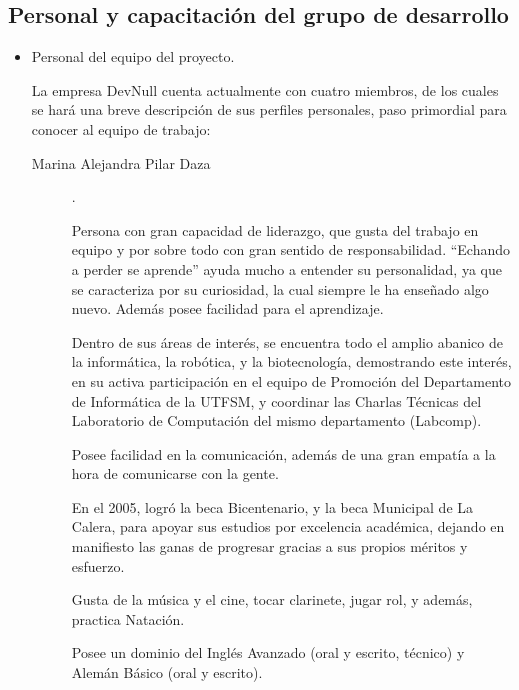 \documentclass[letterpaper,spanish,10pt]{article}
\begin{document}
\subsection{Personal y capacitaci\'on del grupo de desarrollo}
\begin{itemize}

    \item Personal del equipo del proyecto.
		
La empresa DevNull cuenta actualmente con cuatro miembros, de los cuales se har\'a una breve descripci\'on de sus perfiles personales, paso primordial para conocer al equipo de trabajo:

	\begin{description}
		
	\item[Marina Alejandra Pilar Daza].

Persona con gran capacidad de liderazgo, que gusta del trabajo en equipo y por sobre todo con gran sentido de responsabilidad. 
``Echando a perder se aprende'' ayuda mucho a entender su personalidad, ya que se caracteriza por su curiosidad, la cual siempre le ha ense\~nado algo nuevo. Adem\'as posee facilidad para el aprendizaje. 

Dentro de sus \'areas de inter\'es, se encuentra todo el amplio abanico de la inform\'atica, la rob\'otica, y la biotecnolog\'ia, demostrando este inter\'es, en su activa participaci\'on en el equipo de Promoci\'on del Departamento de Inform\'atica de la UTFSM, y coordinar las Charlas T\'ecnicas del Laboratorio de Computaci\'on del mismo departamento (Labcomp).

Posee facilidad en la comunicaci\'on, adem\'as de una gran empat\'ia a la hora de comunicarse con la gente.

En el 2005, logr\'o la beca Bicentenario, y la beca Municipal de La Calera, para apoyar sus estudios por excelencia acad\'emica, dejando en manifiesto las ganas de progresar gracias a sus propios m\'eritos y esfuerzo.

Gusta de la m\'usica y el cine, tocar clarinete, jugar rol, y adem\'as, practica Nataci\'on.

Posee un dominio del Ingl\'es Avanzado (oral y escrito, t\'ecnico) y Alem\'an B\'asico (oral y escrito).


\end{description}
\end{itemize}
\end{document}
